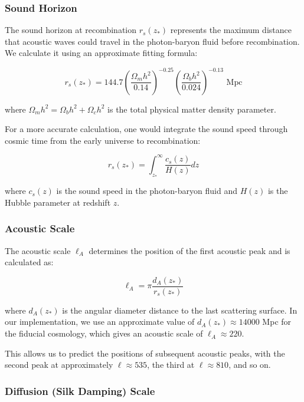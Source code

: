 \documentclass[11pt]{article}
\begin{document}
\subsubsection{Sound Horizon}

The sound horizon at recombination $r_s(z_*)$ represents the maximum distance that acoustic waves could travel in the photon-baryon fluid before recombination. We calculate it using an approximate fitting formula:

\begin{equation}
r_s(z_*) = 144.7 \left(\frac{\Omega_m h^2}{0.14}\right)^{-0.25} \left(\frac{\Omega_b h^2}{0.024}\right)^{-0.13} \text{ Mpc}
\end{equation}

where $\Omega_m h^2 = \Omega_b h^2 + \Omega_c h^2$ is the total physical matter density parameter.

For a more accurate calculation, one would integrate the sound speed through cosmic time from the early universe to recombination:

\begin{equation}
r_s(z_*) = \int_{z_*}^{\infty} \frac{c_s(z)}{H(z)} dz
\end{equation}

where $c_s(z)$ is the sound speed in the photon-baryon fluid and $H(z)$ is the Hubble parameter at redshift $z$.

\subsubsection{Acoustic Scale}

The acoustic scale $\ell_A$ determines the position of the first acoustic peak and is calculated as:

\begin{equation}
\ell_A = \pi \frac{d_A(z_*)}{r_s(z_*)}
\end{equation}

where $d_A(z_*)$ is the angular diameter distance to the last scattering surface. In our implementation, we use an approximate value of $d_A(z_*) \approx 14000$ Mpc for the fiducial cosmology, which gives an acoustic scale of $\ell_A \approx 220$.

This allows us to predict the positions of subsequent acoustic peaks, with the second peak at approximately $\ell \approx 535$, the third at $\ell \approx 810$, and so on.

\subsubsection{Diffusion (Silk Damping) Scale}
\end{document}
